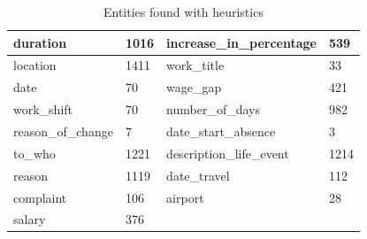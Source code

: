 \begin{table}[h]
    \centering
    \begin{tabular}{|l|l|l|l|}
    \hline
    duration                 & 1016 & increase\_in\_percentage & 539 \\ \hline
    location                 & 1411 & work\_title & 33 \\ \hline
    date                     & 70   & wage\_gap & 421 \\ \hline
    work\_shift              & 70   & number\_of\_days & 982 \\ \hline
    reason\_of\_change       & 7    & date\_start\_absence & 3 \\ \hline
    to\_who                  & 1221 & description\_life\_event & 1214 \\ \hline
    reason                   & 1119 & date\_travel & 112 \\ \hline
    complaint                & 106  & airport & 28 \\ \hline
    salary                   & 376  & & \\ \hline
    \end{tabular}
    \caption{Entities found with heuristics}\label{table:entities_found_heuristics}
\end{table}


